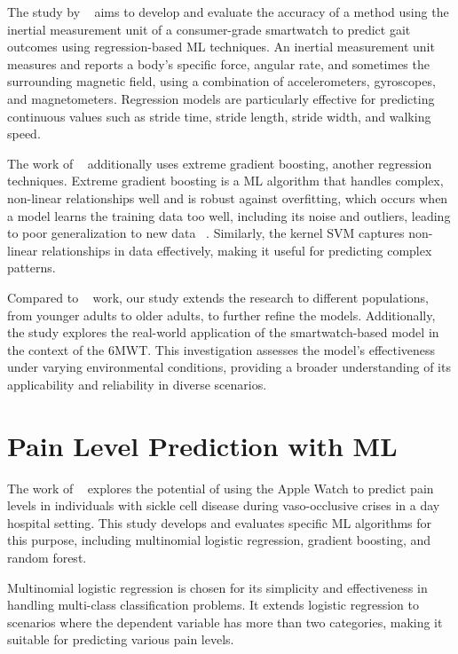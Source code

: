 The study by ~\textcite{Bailey} aims to develop and evaluate the accuracy of a method using the inertial measurement unit of a consumer-grade smartwatch to predict gait outcomes using regression-based ML techniques. An inertial measurement unit measures and reports a body's specific force, angular rate, and sometimes the surrounding magnetic field, using a combination of accelerometers, gyroscopes, and magnetometers. Regression models are particularly effective for predicting continuous values such as stride time, stride length, stride width, and walking speed.

The work of ~\textcite{Bailey} additionally uses extreme gradient boosting, another regression techniques. Extreme gradient boosting is a ML algorithm that handles complex, non-linear relationships well and is robust against overfitting, which occurs when a model learns the training data too well, including its noise and outliers, leading to poor generalization to new data ~\cite{Stojancic}. Similarly, the kernel SVM captures non-linear relationships in data effectively, making it useful for predicting complex patterns.

Compared to ~\textcite{Bailey} work, our study extends the research to different populations, from younger adults to older adults, to further refine the models. Additionally, the study explores the real-world application of the smartwatch-based model in the context of the 6MWT. This investigation assesses the model's effectiveness under varying environmental conditions, providing a broader understanding of its applicability and reliability in diverse scenarios.

\section{Pain Level Prediction with ML}

The work of ~\textcite{Stojancic} explores the potential of using the Apple Watch to predict pain levels in individuals with sickle cell disease during vaso-occlusive crises in a day hospital setting. This study develops and evaluates specific ML algorithms for this purpose, including multinomial logistic regression, gradient boosting, and random forest.

Multinomial logistic regression is chosen for its simplicity and effectiveness in handling multi-class classification problems. It extends logistic regression to scenarios where the dependent variable has more than two categories, making it suitable for predicting various pain levels.

